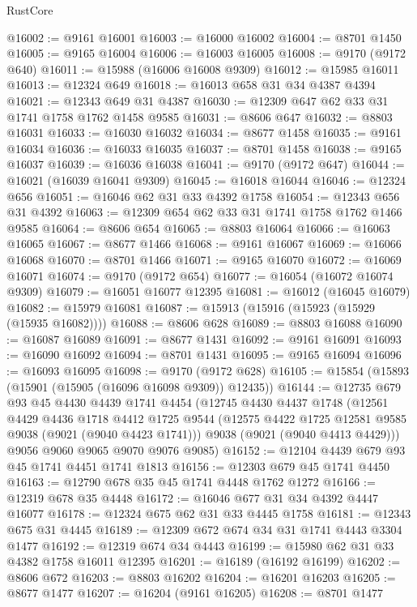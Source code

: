 \begin{lexlean}{RustCore}
\begin{coremodule}
@16002 := @9161 @16001
@16003 := @16000 @16002
@16004 := @8701 @1450
@16005 := @9165 @16004
@16006 := @16003 @16005
@16008 := @9170 (@9172 @640)
@16011 := @15988 (@16006 @16008 @9309)
@16012 := @15985 @16011
@16013 := @12324 @649
@16018 := @16013 @658 @31 @34 @4387 @4394
@16021 := @12343 @649 @31 @4387
@16030 := @12309 @647 @62 @33 @31 @1741 @1758 @1762 @1458 @9585
@16031 := @8606 @647
@16032 := @8803 @16031
@16033 := @16030 @16032
@16034 := @8677 @1458
@16035 := @9161 @16034
@16036 := @16033 @16035
@16037 := @8701 @1458
@16038 := @9165 @16037
@16039 := @16036 @16038
@16041 := @9170 (@9172 @647)
@16044 := @16021 (@16039 @16041 @9309)
@16045 := @16018 @16044
@16046 := @12324 @656
@16051 := @16046 @62 @31 @33 @4392 @1758
@16054 := @12343 @656 @31 @4392
@16063 := @12309 @654 @62 @33 @31 @1741 @1758 @1762 @1466 @9585
@16064 := @8606 @654
@16065 := @8803 @16064
@16066 := @16063 @16065
@16067 := @8677 @1466
@16068 := @9161 @16067
@16069 := @16066 @16068
@16070 := @8701 @1466
@16071 := @9165 @16070
@16072 := @16069 @16071
@16074 := @9170 (@9172 @654)
@16077 := @16054 (@16072 @16074 @9309)
@16079 := @16051 @16077 @12395
@16081 := @16012 (@16045 @16079)
@16082 := @15979 @16081
@16087 := @15913 (@15916 (@15923 (@15929 (@15935 @16082))))
@16088 := @8606 @628
@16089 := @8803 @16088
@16090 := @16087 @16089
@16091 := @8677 @1431
@16092 := @9161 @16091
@16093 := @16090 @16092
@16094 := @8701 @1431
@16095 := @9165 @16094
@16096 := @16093 @16095
@16098 := @9170 (@9172 @628)
@16105 := @15854 (@15893 (@15901 (@15905 (@16096 @16098 @9309)) @12435))
@16144 := @12735
    @679
    @93
    @45
    @4430
    @4439
    @1741
    @4454
    (@12745
      @4430
      @4437
      @1748
      (@12561
        @4429
        @4436
        @1718
        @4412
        @1725
        @9544
        (@12575 @4422 @1725 @12581 @9585 @9038 (@9021 (@9040 @4423 @1741)))
        @9038
        (@9021 (@9040 @4413 @4429)))
      @9056
      @9060
      @9065
      @9070
      @9076
      @9085)
@16152 := @12104 @4439 @679 @93 @45 @1741 @4451 @1741 @1813
@16156 := @12303 @679 @45 @1741 @4450
@16163 := @12790 @678 @35 @45 @1741 @4448 @1762 @1272
@16166 := @12319 @678 @35 @4448
@16172 := @16046 @677 @31 @34 @4392 @4447 @16077
@16178 := @12324 @675 @62 @31 @33 @4445 @1758
@16181 := @12343 @675 @31 @4445
@16189 := @12309 @672 @674 @34 @31 @1741 @4443 @3304 @1477
@16192 := @12319 @674 @34 @4443
@16199 := @15980 @62 @31 @33 @4382 @1758 @16011 @12395
@16201 := @16189 (@16192 @16199)
@16202 := @8606 @672
@16203 := @8803 @16202
@16204 := @16201 @16203
@16205 := @8677 @1477
@16207 := @16204 (@9161 @16205)
@16208 := @8701 @1477

\end{coremodule}
\end{lexlean}
